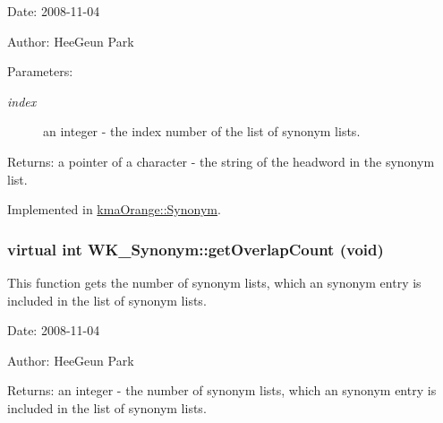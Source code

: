 \begin{Desc}
\item[Date:]2008-11-04 \end{Desc}
\begin{Desc}
\item[Author:]HeeGeun Park \end{Desc}
\begin{Desc}
\item[Parameters:]
\begin{description}
\item[{\em index}]an integer - the index number of the list of synonym lists. \end{description}
\end{Desc}
\begin{Desc}
\item[Returns:]a pointer of a character - the string of the headword in the synonym list. \end{Desc}


Implemented in \hyperlink{classkmaOrange_1_1Synonym_c15a3ecb61bc07409975df19fee47f6d}{kmaOrange::Synonym}.\hypertarget{classWK__Synonym_a2ba8f7959f61d8b551e6982bcebc459}{
\subsubsection[{getOverlapCount}]{\setlength{\rightskip}{0pt plus 5cm}virtual int WK\_\-Synonym::getOverlapCount (void)}}
\label{classWK__Synonym_a2ba8f7959f61d8b551e6982bcebc459}


This function gets the number of synonym lists, which an synonym entry is included in the list of synonym lists. 

\begin{Desc}
\item[Date:]2008-11-04 \end{Desc}
\begin{Desc}
\item[Author:]HeeGeun Park \end{Desc}
\begin{Desc}
\item[Returns:]an integer - the number of synonym lists, which an synonym entry is included in the list of synonym lists. \end{Desc}


